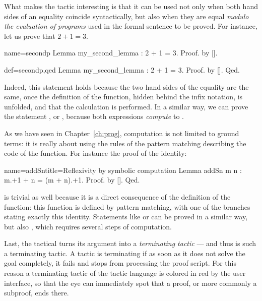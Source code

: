 What makes the   tactic interesting is that it
can be used not only when both
hand sides of an equality coincide syntactically, but also when they are
equal \emph{modulo the evaluation of programs} used in the formal
sentence to be proved.
For instance, let us prove that $2 + 1 = 3$.

\begin{coqdef}{name=secondp}
Lemma my_second_lemma : 2 + 1 = 3.
Proof. by [].
\end{coqdef}
\begin{coq}{def=secondp,qed}{}
Lemma my_second_lemma : 2 + 1 = 3.
Proof. by []. Qed.
\end{coq}

Indeed, this statement holds because the two hand sides of the equality
are the same, once the definition of the  function, hidden
behind the infix \C{+} notation, is unfolded, and that the calculation
is performed. In a similar way, we can prove the statement
, or , because both expressions \emph{compute} to
.

As we have seen in Chapter~\ref{ch:prog}, computation is not limited
to ground terms: it is really about using the rules of the pattern
matching describing the code of the function. For instance the proof
of the  identity:

\begin{coq}{name=addSn}{title=Reflexivity by symbolic computation}
Lemma addSn m n : m.+1 + n = (m + n).+1. Proof. by []. Qed.
\end{coq}
is trivial as well because it is a direct consequence of the
definition of the  function: this function is defined by
pattern matching, with one of the branches stating exactly this
identity. Statements like
 or  can be proved in a similar way, but
also , which requires several steps of computation.

Last, the  tactical turns its argument into a \emph{terminating
tactic} --- and thus   is such a terminating tactic. A tactic
is terminating if as soon as it does not solve the goal completely, it
fails and stops \Coq{} from processing the proof script. For this reason
a terminating tactic of the tactic language is colored in red by the
user interface, so that the eye can immediately spot that a
proof, or more commonly a subproof, ends there.

